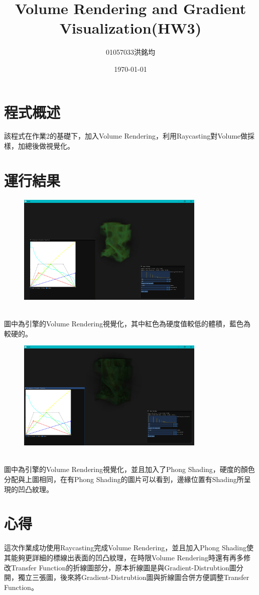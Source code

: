 \documentclass[a4paper,12pt]{article}
\title{Volume Rendering and Gradient Visualization(HW3)}
\author{01057033洪銘均}
\date{\today}
\begin{document}
\maketitle
\tableofcontents
\newpage

\section{程式概述}
該程式在作業2的基礎下，加入Volume Rendering，利用Raycasting對Volume做採樣，加總後做視覺化。


\section{運行結果}

\begin{figure}[h]
    \centering
    \includegraphics[width=0.8\textwidth]{img/img0.png}
\end{figure} \\
圖中為引擎的Volume Rendering視覺化，其中紅色為硬度值較低的體積，藍色為較硬的。\\

\begin{figure}[h]
    \centering
    \includegraphics[width=0.8\textwidth]{img/img1.png}
\end{figure} \\
圖中為引擎的Volume Rendering視覺化，並且加入了Phong Shading，硬度的顏色分配與上圖相同，在有Phong Shading的圖片可以看到，邊緣位置有Shading所呈現的凹凸紋理。\\

\section{心得}
這次作業成功使用Raycasting完成Volume Rendering，並且加入Phong Shading使其能夠更詳細的標線出表面的凹凸紋理，在時限Volume Rendering時還有再多修改Transfer Function的折線圖部分，原本折線圖是與Gradient-Distrubtion圖分開，獨立三張圖，後來將Gradient-Distrubtion圖與折線圖合併方便調整Transfer Function。
\end{document}
